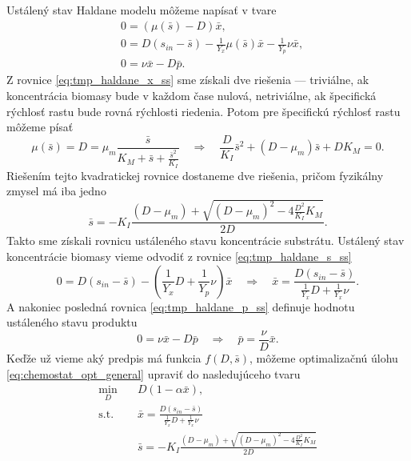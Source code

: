 Ustálený stav Haldane modelu môžeme napísať v tvare
\begin{align}
	&0 = \left(\mu(\bar{s}) - D\right)\bar{x}, \label{eq:tmp_haldane_x_ss}\\
	&0 = D\left(s_{in} - \bar{s}\right) - \frac{1}{Y_{x}}\mu(\bar{s})\bar{x} - \frac{1}{Y_{p}}\nu \bar{x}, \label{eq:tmp_haldane_s_ss}\\
	&0 = \nu \bar{x} - D\bar{p} \label{eq:tmp_haldane_p_ss}.
\end{align}
Z rovnice \eqref{eq:tmp_haldane_x_ss} sme získali dve riešenia --- triviálne, ak koncentrácia biomasy bude v každom čase nulová, netriviálne, ak špecifická rýchlosť rastu bude rovná rýchlosti riedenia. Potom pre špecifickú rýchlosť rastu môžeme písať 
\begin{equation}
	\mu(\bar{s}) = D = \mu_{m}\frac{\bar{s}}{K_{M} + \bar{s} + \frac{\bar{s}^2}{K_{I}}} \quad \Longrightarrow \quad
	\frac{D}{K_{I}}\bar{s}^2 + (D-\mu_{m})\bar{s} + DK_{M} = 0.
\end{equation}
Riešením tejto kvadratickej rovnice dostaneme dve riešenia, pričom fyzikálny zmysel má iba jedno
\begin{equation}
	\label{eq:haldane_subs_ss}
	\bar{s} = -K_{I}\frac{\left(D-\mu_{m}\right) + \sqrt{\left(D-\mu_{m}\right)^2 - 4\frac{D^2}{K_{I}}K_{M}}}{2D}. 
\end{equation}
Takto sme získali rovnicu ustáleného stavu koncentrácie substrátu. Ustálený stav koncentrácie biomasy vieme odvodiť z rovnice \eqref{eq:tmp_haldane_s_ss}
\begin{equation}
\label{eq:haldane_biomass_ss}
	0 = D\left(s_{in}-\bar{s}\right) - \left(\frac{1}{Y_{x}}D + \frac{1}{Y_{p}}\nu\right)\bar{x} \quad \Longrightarrow \quad
	\bar{x} = \frac{D\left(s_{in}-\bar{s}\right)}{\frac{1}{Y_{x}}D + \frac{1}{Y_{x}}\nu}. 
\end{equation}
A nakoniec posledná rovnica \eqref{eq:tmp_haldane_p_ss} definuje hodnotu ustáleného stavu produktu
\begin{equation}
\label{eq:haldane_product_ss}
	0 = \nu \bar{x} - D\bar{p} \quad \Longrightarrow \quad \bar{p} = \frac{\nu}{D}\bar{x}.
\end{equation}
Keďže už vieme aký predpis má funkcia $ f(D,\bar{s}) $, môžeme optimalizačnú úlohu \eqref{eq:chemostat_opt_general} upraviť do nasledujúceho tvaru 
\begin{equation}
\label{eq:chemostat_opt_w_ss}
	 \begin{split}
		 \min_{D} &\quad D\left(1-\alpha\bar{x}\right), \\
		 \text{s.t.} &\quad \bar{x} = \frac{D\left(s_{in}-\bar{s}\right)}{\frac{1}{Y_{x}}D + \frac{1}{Y_{x}}\nu} \\
		 &\quad \bar{s} = -K_{I}\frac{\left(D-\mu_{m}\right) + \sqrt{\left(D-\mu_{m}\right)^2 - 4\frac{D^2}{K_{I}}K_{M}}}{2D}
	 \end{split}
\end{equation}

